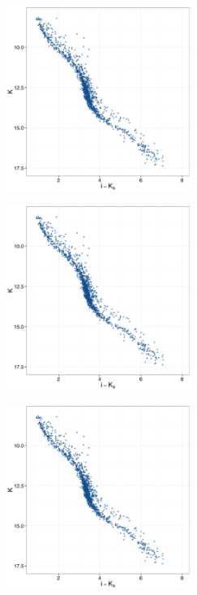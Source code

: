 \begin{figure}[ht!]
    \centering
    \begin{subfigure}[t]{0.45\textwidth}
        \includegraphics[page=2,height=6cm]{background/Figures/CIs.pdf}
        \caption{}
        
    \end{subfigure}
    \begin{subfigure}[t]{0.45\textwidth}
      \includegraphics[page=3,height=6cm]{background/Figures/CIs.pdf}
        \caption{}
         
    \end{subfigure}
     \begin{subfigure}[t]{0.45\textwidth}
      \includegraphics[page=4,height=6cm]{background/Figures/CIs.pdf}
        \caption{}
         

\end{subfigure}
\end{figure}
